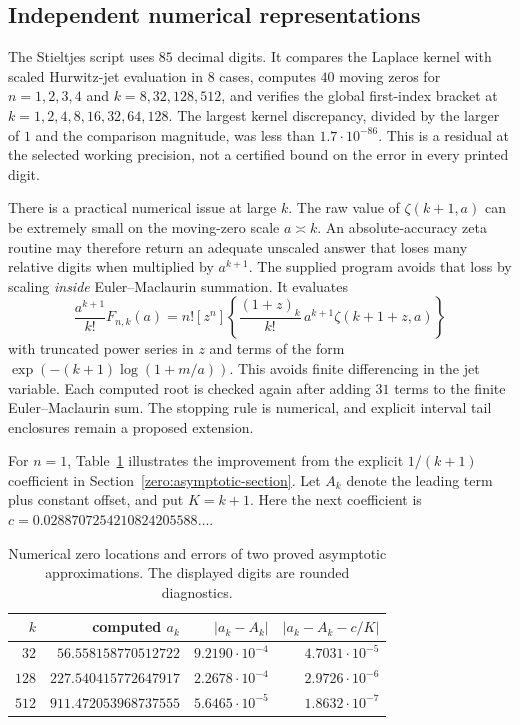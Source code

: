 \documentclass[11pt,a4paper]{article}
\theoremstyle{definition}
\theoremstyle{remark}
\numberwithin{equation}{section}
\begin{document}
\subsection{Independent numerical representations}

The Stieltjes script uses $85$ decimal digits. It compares the
Laplace kernel with scaled Hurwitz-jet evaluation in $8$ cases,
computes $40$ moving zeros for $n=1,2,3,4$ and
$k=8,32,128,512$, and verifies the global first-index bracket at
$k=1,2,4,8,16,32,64,128$. The largest kernel discrepancy, divided
by the larger of $1$ and the comparison magnitude, was less than
$1.7\cdot10^{-86}$. This is a residual at the selected working
precision, not a certified bound on the error in every printed digit.

There is a practical numerical issue at large $k$. The raw value of
$\zeta(k+1,a)$ can be extremely small on the moving-zero scale
$a\asymp k$. An absolute-accuracy zeta routine may therefore return
an adequate unscaled answer that loses many relative digits when
multiplied by $a^{k+1}$. The supplied program avoids that loss by
scaling \emph{inside} Euler--Maclaurin summation. It evaluates
\[
 \frac{a^{k+1}}{k!}F_{n,k}(a)
 =n![z^n]\left\{
     \frac{(1+z)_k}{k!}\,a^{k+1}\zeta(k+1+z,a)
                  \right\}
\]
with truncated power series in $z$ and terms of the form
$\exp(-(k+1)\log(1+m/a))$. This avoids finite differencing in the
jet variable. Each computed root is checked again after adding
$31$ terms to the finite Euler--Maclaurin sum. The stopping rule is
numerical, and explicit interval tail enclosures remain a proposed
extension.

For $n=1$, Table~\ref{verification:zeros} illustrates the improvement
from the explicit $1/(k+1)$ coefficient in
Section~\ref{zero:asymptotic-section}. Let $A_k$ denote the
leading term plus constant offset, and put $K=k+1$.
Here the next coefficient is
$c=0.0288707254210824205588\ldots$.

\begin{table}[htbp]
\centering
\small
\begin{tabular}{r r r r}
\toprule
$k$ & computed $a_k$ & $|a_k-A_k|$ & $|a_k-A_k-c/K|$\\
\midrule
$32$ & $56.558158770512722$ & $9.2190\cdot10^{-4}$ & $4.7031\cdot10^{-5}$\\
$128$ & $227.540415772647917$ & $2.2678\cdot10^{-4}$ & $2.9726\cdot10^{-6}$\\
$512$ & $911.472053968737555$ & $5.6465\cdot10^{-5}$ & $1.8632\cdot10^{-7}$\\
\bottomrule
\end{tabular}
\caption{Numerical zero locations and errors of two proved asymptotic
approximations. The displayed digits are rounded diagnostics.}
\label{verification:zeros}
\end{table}
\end{document}
